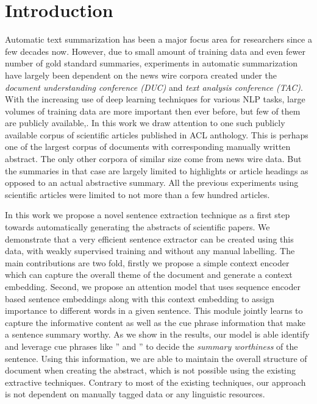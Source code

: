 \section{Introduction}

Automatic text summarization has been a major focus area for researchers since a few decades now. However, due to small amount of training data and even fewer number of gold standard summaries, experiments in automatic summarization have largely been dependent on the news wire corpora created under the \emph{document understanding conference (DUC)} and \emph{text analysis conference (TAC)}. With the increasing use of deep learning techniques for various NLP tasks, large volumes of training data are more important then ever before, but few of them are publicly available\cite{rush2015neural},\cite{filippova2015sentence}. In this work we draw attention to one such publicly available corpus of scientific articles published in ACL anthology. This is perhaps one of the largest corpus of documents with corresponding manually written abstract. The only other corpora of similar size come from news wire data. But the summaries in that case are largely limited to highlights or article headings as opposed to an actual abstractive summary. All the previous experiments using scientific articles were limited to not more than a few hundred articles\cite{abu2011coherent}. 

In this work we propose a novel sentence extraction technique as a first step towards automatically generating the abstracts of scientific papers. We demonstrate that a very efficient sentence extractor can be created using this data, with weakly supervised training and without any manual labelling. The main contributions are two fold, firstly we propose a simple context encoder which can capture the overall theme of the document and generate a context embedding. Second, we propose an attention model that uses sequence encoder based sentence embeddings along with this context embedding to assign importance to different words in a given sentence. This module jointly learns to capture the informative content as well as the cue phrase information that make a sentence summary worthy. As we show in the results, our model is able identify and leverage cue phrases like '' and '' to decide the \emph{summary worthiness} of the sentence. Using this information, we are able to maintain the overall structure of document when creating the abstract, which is not possible using the existing extractive techniques. Contrary to most of the existing techniques, our approach is not dependent on manually tagged data or any linguistic resources.
 

